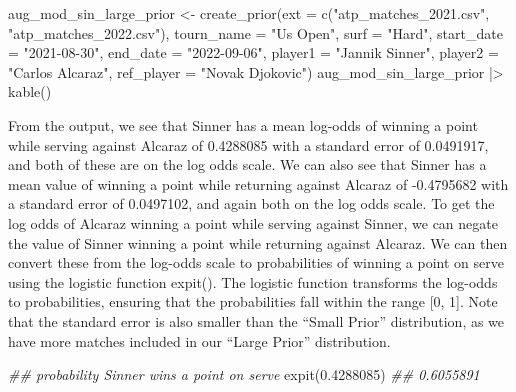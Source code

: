 \documentclass[
  letterpaper,
  DIV=11,
  numbers=noendperiod]{scrartcl}
\newenvironment{Shaded}{\begin{snugshade}}{\end{snugshade}}
\newcommand{\AttributeTok}[1]{\textcolor[rgb]{0.40,0.45,0.13}{#1}}
\newcommand{\DocumentationTok}[1]{\textcolor[rgb]{0.37,0.37,0.37}{\textit{#1}}}
\newcommand{\FloatTok}[1]{\textcolor[rgb]{0.68,0.00,0.00}{#1}}
\newcommand{\FunctionTok}[1]{\textcolor[rgb]{0.28,0.35,0.67}{#1}}
\newcommand{\NormalTok}[1]{\textcolor[rgb]{0.00,0.23,0.31}{#1}}
\newcommand{\OtherTok}[1]{\textcolor[rgb]{0.00,0.23,0.31}{#1}}
\newcommand{\SpecialCharTok}[1]{\textcolor[rgb]{0.37,0.37,0.37}{#1}}
\newcommand{\StringTok}[1]{\textcolor[rgb]{0.13,0.47,0.30}{#1}}
\begin{document}
\begin{Shaded}
\begin{Highlighting}[]
\NormalTok{aug\_mod\_sin\_large\_prior }\OtherTok{\textless{}{-}} \FunctionTok{create\_prior}\NormalTok{(}\AttributeTok{ext =} \FunctionTok{c}\NormalTok{(}\StringTok{"atp\_matches\_2021.csv"}\NormalTok{,}
                                 \StringTok{"atp\_matches\_2022.csv"}\NormalTok{),}
                         \AttributeTok{tourn\_name =} \StringTok{"Us Open"}\NormalTok{,}
                         \AttributeTok{surf =} \StringTok{"Hard"}\NormalTok{,}
                         \AttributeTok{start\_date =} \StringTok{"2021{-}08{-}30"}\NormalTok{,}
                         \AttributeTok{end\_date =} \StringTok{"2022{-}09{-}06"}\NormalTok{,}
                         \AttributeTok{player1 =} \StringTok{"Jannik Sinner"}\NormalTok{,}
                         \AttributeTok{player2 =} \StringTok{"Carlos Alcaraz"}\NormalTok{,}
                         \AttributeTok{ref\_player =} \StringTok{"Novak Djokovic"}\NormalTok{)}
\NormalTok{aug\_mod\_sin\_large\_prior }\SpecialCharTok{|\textgreater{}} \FunctionTok{kable}\NormalTok{()}
\end{Highlighting}
\end{Shaded}

\linespread{2}

From the output, we see that Sinner has a mean log-odds of winning a
point while serving against Alcaraz of 0.4288085 with a standard error
of 0.0491917, and both of these are on the log odds scale. We can also
see that Sinner has a mean value of winning a point while returning
against Alcaraz of -0.4795682 with a standard error of 0.0497102, and
again both on the log odds scale. To get the log odds of Alcaraz winning
a point while serving against Sinner, we can negate the value of Sinner
winning a point while returning against Alcaraz. We can then convert
these from the log-odds scale to probabilities of winning a point on
serve using the logistic function expit(). The logistic function
transforms the log-odds to probabilities, ensuring that the
probabilities fall within the range {[}0, 1{]}. Note that the standard
error is also smaller than the ``Small Prior'' distribution, as we have
more matches included in our ``Large Prior'' distribution.

\linespread{0.9}

\begin{Shaded}
\begin{Highlighting}[]
\DocumentationTok{\#\# probability Sinner wins a point on serve}
\FunctionTok{expit}\NormalTok{(}\FloatTok{0.4288085}\NormalTok{) }\DocumentationTok{\#\# 0.6055891}
\end{Highlighting}
\end{Shaded}
\end{document}
